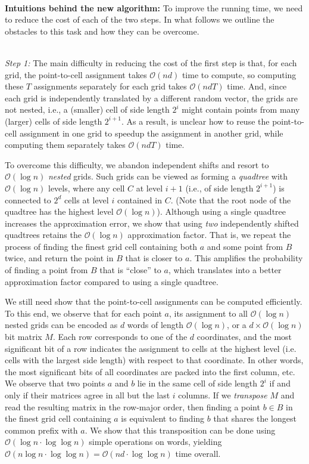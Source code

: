 \documentclass[11pt]{article}
\theoremstyle{plain}
\newcommand{\OO}{\mathcal{O}}
\begin{document}
\ \\
{\bf Intuitions behind the new algorithm:}  To improve the running time, we need to reduce the cost of each of the two steps. In what follows we outline the obstacles to this task and how they can be overcome. 

\ \\
{\em Step 1: } The main difficulty in reducing the cost of the first step is that, for each grid,  the point-to-cell assignment takes $\OO(nd)$ time to compute, so computing these $T$ assignments separately for each grid takes $\OO(nd T)$ time. And,  since each grid is independently translated by a different random vector,  the grids are not nested, i.e., a  (smaller) cell of side length $2^i$ might contain points from many  (larger) cells of side length $2^{i+1}$.
As a result,  is unclear how to reuse the point-to-cell assignment in one grid to speedup the assignment in another grid, while computing them separately takes $\OO(ndT)$ time. 

To overcome this difficulty, we abandon independent shifts and resort to $\OO(\log n)$ {\em nested} grids. 
Such grids can be viewed as forming a {\em quadtree} with $\OO(\log n)$ levels, where any cell $C$ at level $i+1$ (i.e., of side length $2^{i+1}$) is connected to $2^d$ cells at level $i$ contained in $C$.
(Note that the root node of the quadtree has the highest level $\OO(\log n)$).
Although using a single quadtree increases the approximation error, we show that using {\em two} independently shifted quadtrees retains the $\OO(\log n)$ approximation factor. That is, we repeat the process of finding the finest grid cell containing both $a$ and some point from $B$ twice, and return the point in $B$ that is closer to $a$. This amplifies the probability of finding a point from $B$ that is ``close'' to $a$, which translates into a better approximation factor compared to using a single quadtree.

We still need show that the point-to-cell assignments can be computed efficiently. To this end, we observe that for each point $a$, its assignment to all $\OO(\log n)$ nested grids can be encoded as $d$ words of length $\OO(\log n)$, or a $d \times \OO(\log n)$ bit matrix $M$. Each row corresponds to one of the $d$ coordinates, and the most significant bit of a row indicates the assignment to cells at the highest level (i.e. cells with the largest side length) with respect to that coordinate. In other words, the most significant bits of all coordinates are packed into the first column, etc. We observe that two points $a$ and $b$  lie in the same cell of side length $2^{i}$ if and only if their matrices agree in all but the last $i$ columns.
If we {\em transpose} $M$ and read the resulting matrix in the row-major order, then finding a point $b \in B$ in the finest grid cell containing $a$ is equivalent to finding $b$ that shares the longest common prefix with $a$. We show that this transposition can be done using $\OO( \log n \cdot \log \log n)$ simple operations on words, yielding $\OO(n \log n \cdot \log \log n) = \OO(n d \cdot \log \log n)$ time overall.
\end{document}
